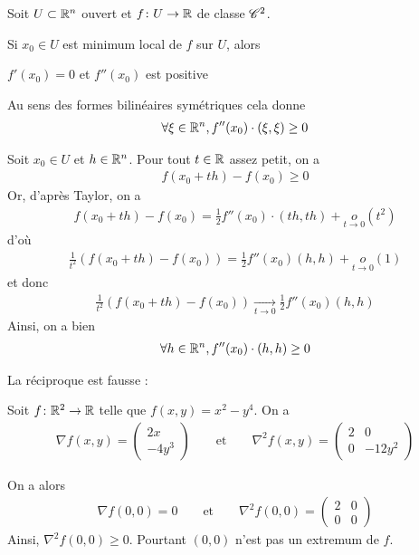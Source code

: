 \documentclass[french,a4paper,10pt]{article}
\begin{document}
	\begin{oc-theorem}\label{thm:1.2.4}
		Soit $U\subset\mathbb{R}^n$ ouvert et $f\colon U\to\mathbb{R}$ de classe $\mathscr{C}^2$.
		
		Si $x_0\in U$ est minimum local de $f$ sur $U$, alors
		\begin{center}
			$f'(x_0)=0$ et $f''(x_0)$ est positive
		\end{center}
		
		Au sens des formes bilinéaires symétriques cela donne 
			\[\begin{aligned}
				\forall \xi\in\mathbb{R}^n,f''(x_0)\cdot(\xi,\xi)\ge 0
			\end{aligned}\]
	\end{oc-theorem}
	\begin{myproof}
		Soit $x_0\in U$ et $h\in\mathbb{R}^n$. Pour tout $t\in\mathbb{R}$ assez petit, on a
			\[\begin{aligned}
				f(x_0+th)-f(x_0)\ge 0
			\end{aligned}\]
		Or, d'après Taylor, on a
			\[\begin{aligned}
				f(x_0+th)-f(x_0)=\frac12 f''(x_0)\cdot(th,th)+\underset{t\to 0}o(t^2)
			\end{aligned}\]
		d'où
			\[\begin{aligned}
				\frac1{t^2}(f(x_0+th)-f(x_0))=\frac12f''(x_0)(h,h)+\underset{t\to 0}o(1)
			\end{aligned}\]
		et donc
			\[\begin{aligned}
				\frac1{t^2}(f(x_0+th)-f(x_0))\underset{t\to0}\to \frac12f''(x_0)(h,h)
			\end{aligned}\]
		Ainsi, on a bien
			\[\begin{aligned}
				\forall h\in\mathbb{R}^n,f''(x_0)\cdot(h,h)\ge 0
			\end{aligned}\]
	\end{myproof}
	\begin{oc-remark}
		La réciproque est fausse :
		
		Soit $f\colon\mathbb{R}^2\to\mathbb{R}$ telle que $f(x,y)=x^2-y^4$. On a
			\[\begin{aligned}
				\nabla f(x,y)=
					\begin{pmatrix*}
						2x\\
						-4y^3
					\end{pmatrix*}
				\qquad \text{et}\qquad \nabla^2f(x,y)=
					\begin{pmatrix*}
						2&0\\
						0&-12y^2
					\end{pmatrix*}
			\end{aligned}\]
		
		On a alors 
			\[\begin{aligned}
				\nabla f(0,0)=0\qquad\text{et}\qquad\nabla^2f(0,0)=
					\begin{pmatrix*}
						2&0\\
						0&0
					\end{pmatrix*}
			\end{aligned}\]
		Ainsi, $\nabla^2f(0,0)\ge0$. Pourtant $(0,0)$ n'est pas un extremum de $f$.
		
	\end{oc-remark}
	
\end{document}
